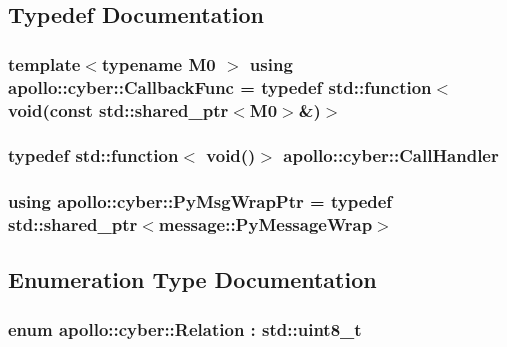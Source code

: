 \subsection{Typedef Documentation}
\hypertarget{namespaceapollo_1_1cyber_ac2b119de9ef52dbfcee3b6e8d497adc4}{
\subsubsection[{Callback\-Func}]{\setlength{\rightskip}{0pt plus 5cm}template$<$typename M0 $>$ using {\bf apollo\-::cyber\-::\-Callback\-Func} = typedef std\-::function$<$void(const std\-::shared\-\_\-ptr$<$M0$>$\&)$>$}}\label{namespaceapollo_1_1cyber_ac2b119de9ef52dbfcee3b6e8d497adc4}
\hypertarget{namespaceapollo_1_1cyber_a73f7b365c4d923725c0a03bfb8c97978}{
\subsubsection[{Call\-Handler}]{\setlength{\rightskip}{0pt plus 5cm}typedef std\-::function$<$ void()$>$ {\bf apollo\-::cyber\-::\-Call\-Handler}}}\label{namespaceapollo_1_1cyber_a73f7b365c4d923725c0a03bfb8c97978}
\hypertarget{namespaceapollo_1_1cyber_a1152fb39339af5618cb8e3a7afc89703}{
\subsubsection[{Py\-Msg\-Wrap\-Ptr}]{\setlength{\rightskip}{0pt plus 5cm}using {\bf apollo\-::cyber\-::\-Py\-Msg\-Wrap\-Ptr} = typedef std\-::shared\-\_\-ptr$<${\bf message\-::\-Py\-Message\-Wrap}$>$}}\label{namespaceapollo_1_1cyber_a1152fb39339af5618cb8e3a7afc89703}


\subsection{Enumeration Type Documentation}
\hypertarget{namespaceapollo_1_1cyber_a688ac951fd0a3965da4acdc34c92e50f}{
\subsubsection[{Relation}]{\setlength{\rightskip}{0pt plus 5cm}enum {\bf apollo\-::cyber\-::\-Relation} \-: std\-::uint8\-\_\-t}}\label{namespaceapollo_1_1cyber_a688ac951fd0a3965da4acdc34c92e50f}


